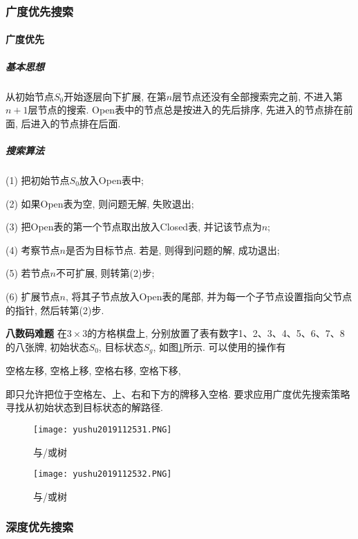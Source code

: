 \subsubsection{广度优先搜索}
\paragraph{广度优先}
\subparagraph{基本思想}
从初始节点$S_0$开始逐层向下扩展, 在第$n$层节点还没有全部搜索完之前, 不进入第$n+1$层节点的搜索. Open表中的节点总是按进入的先后排序, 先进入的节点排在前面, 后进入的节点排在后面.
\subparagraph{搜索算法}

(1) 把初始节点$S_0$放入Open表中;

(2) 如果Open表为空, 则问题无解, 失败退出;

(3) 把Open表的第一个节点取出放入Closed表, 并记该节点为$n$;

(4) 考察节点$n$是否为目标节点. 若是, 则得到问题的解, 成功退出;

(5) 若节点$n$不可扩展, 则转第(2)步;

(6) 扩展节点$n$, 将其子节点放入Open表的尾部, 并为每一个子节点设置指向父节点的指针, 然后转第(2)步.
\begin{example}
\textbf{八数码难题} 在$3\times 3$的方格棋盘上, 分别放置了表有数字1、2、3、4、5、6、7、8的八张牌, 初始状态$S_0$, 目标状态$S_g$, 如图\ref{AI32fig2019120231}所示. 可以使用的操作有
\begin{center}
  空格左移, 空格上移, 空格右移, 空格下移,
\end{center}
即只允许把位于空格左、上、右和下方的牌移入空格. 要求应用广度优先搜索策略寻找从初始状态到目标状态的解路径.
\end{example}
\begin{figure}[H]
\centering
\texttt{[image: yushu2019112531.PNG]}
\caption{与/或树 }
\label{AI32fig2019120231}
\end{figure}
\begin{figure}[H]
\centering
\texttt{[image: yushu2019112532.PNG]}
\caption{与/或树 }
\label{AI32fig32}
\end{figure}
\subsubsection{深度优先搜索}

